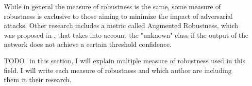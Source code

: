 \documentclass[ %
                    author={Revalda Putawara},
                supervisor={Dr. James Pope},
                    degree={MSc},
                     title={Robustness of Bayesian Neural Networks Design Choices Against Weight and Bias Perturbation Induced by Single Event Upsets (SEUs)},
                      type={},
                      year={2025}]{dissertation}
\begin{document}
\begin{enumerate}
    




   
    
\end{enumerate}

While in general the measure of robustness is the same, some measure of robustness is exclusive to those aiming to minimize the impact of adversarial attacks. Other research includes a metric called Augmented Robustness, which was proposed in \cite{essbai2024a}, that takes into account the "unknown" class if the output of the network does not achieve a certain threshold confidence.


\iffalse
TODO\_in this section, I will explain multiple measure of robustness used in this field. I will write each measure of robustness and which author are including them in their research.
\end{document}
